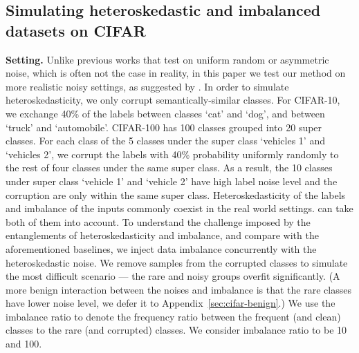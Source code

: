 \subsection{Simulating heteroskedastic and imbalanced datasets on CIFAR}
\label{sec:imbalance}

\textbf{Setting.}
Unlike previous works that test on uniform random or asymmetric noise, which is often not the case in reality, in this paper we test our method on more realistic noisy settings, as suggested by \citet{patrini2017making,zhang2018generalized}. In order to simulate heteroskedasticity, we only corrupt semantically-similar classes. For CIFAR-10, we exchange 40\% of the labels between classes `cat' and `dog', and between `truck' and `automobile'. CIFAR-100 has 100 classes grouped into 20 super classes. For each class of the 5 classes under the super class `vehicles 1' and `vehicles 2', we corrupt the labels with 40\% probability uniformly randomly to the rest of four classes under the same super class. As a result, the 10 classes under super class `vehicle 1' and `vehicle 2' have high label noise level and the corruption are only within the same super class. Heteroskedasticity of the labels and imbalance of the inputs  commonly coexist in the real world settings. {\ours} can take both of them into account. To understand the challenge imposed by the entanglements of heteroskedasticity and imbalance, and compare {\ours} with the aforementioned baselines, we inject data imbalance concurrently with the heteroskedastic noise. 
We remove samples from the corrupted classes to simulate the most difficult scenario --- the rare and noisy groups overfit significantly. (A more benign interaction between the noises and imbalance is that the rare classes have lower noise level, we defer it to Appendix~\ref{sec:cifar-benign}.) We use the imbalance ratio to denote the frequency ratio between the frequent (and clean) classes to the rare (and corrupted) classes. We consider imbalance ratio to be 10 and 100. 

